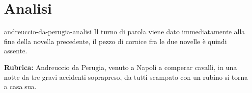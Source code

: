 \documentclass[preview]{standalone}
\begin{document}
\genpage

\section{Analisi}

\begin{snippet}{andreuccio-da-perugia-analisi}
    Il turno di parola viene dato immediatamente alla fine della novella precedente,
    il pezzo di cornice fra le due novelle è quindi assente. 
    
    \textbf{Rubrica:} Andreuccio da Perugia, venuto a Napoli a comperar cavalli, in una notte
    da tre gravi accidenti soprapreso, da tutti scampato con un rubino si torna a
    casa sua.
    
    
    

\end{snippet}
\end{document}
